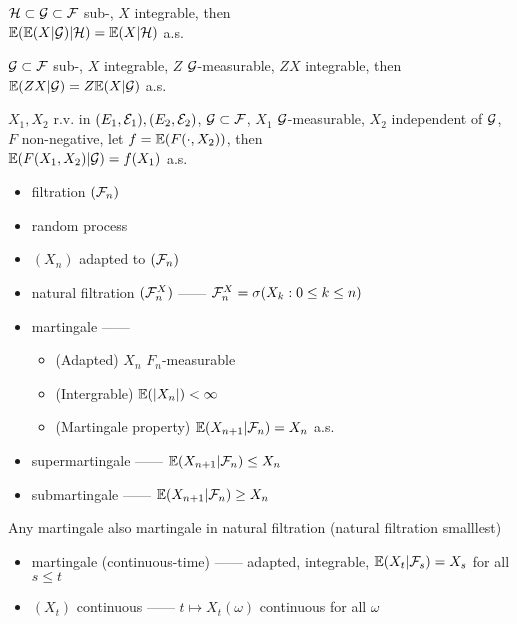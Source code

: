 \begin{prop}
    $\mathcal{H} \subset \mathcal{G} \subset \mathcal{F}$ sub-\sa, $X$ integrable, then \\
    $\mathbb{E}(\mathbb{E}(X|\mathcal{G})|\mathcal{H}) = \mathbb{E}(X|\mathcal{H})$ a.s.\
\end{prop}

\begin{prop}
    $\mathcal{G} \subset \mathcal{F}$ sub-\sa, $X$ integrable, $Z$ $\mathcal{G}$-measurable, $ZX$ integrable, then \\
    $\mathbb{E}(ZX|\mathcal{G}) = Z\mathbb{E}(X|\mathcal{G})$ a.s.\
\end{prop}

\begin{prop}
    $X_1, X_2$ r.v. in $(E_1, \mathcal{E}_1), (E_2, \mathcal{E}_2)$, $\mathcal{G} \subset \mathcal{F}$, $X_1$ $\mathcal{G}$-measurable, $X_2$ independent of $\mathcal{G}$, $F$ non-negative, let $f = \mathbb{E}(F(\cdot, X_2))$, then \\
    $\mathbb{E}(F(X_1, X_2)|\mathcal{G}) = f(X_1)$ a.s.
\end{prop}

\begin{itemize}
    \item filtration $(\mathcal{F}_n)$
    \item random process
    \item $(X_n)$ adapted to $(\mathcal{F}_n)$
    \item natural filtration $(\mathcal{F}_n^X)$ ------ $\mathcal{F}_n^X = \sigma(X_k : 0 \leq k \leq n)$
    \item martingale ------
    \begin{itemize}
        \item (Adapted) $X_n$ $F_n$-measurable
        \item (Intergrable) $\mathbb{E}(|X_n|) < \infty$
        \item (Martingale property) $\mathbb{E}(X_{n+1}|\mathcal{F}_n) = X_n$ a.s.\
    \end{itemize}
    \item supermartingale ------ $\mathbb{E}(X_{n+1}|\mathcal{F}_n) \leq X_n$
    \item submartingale ------ $\mathbb{E}(X_{n+1}|\mathcal{F}_n) \geq X_n$
\end{itemize}

\begin{fact}
    Any martingale also martingale in natural filtration (natural filtration smalllest)
\end{fact}

\begin{itemize}
    \item martingale (continuous-time) ------ adapted, integrable, $\mathbb{E}(X_t|\mathcal{F}_s) = X_s$ for all $s\leq t$
    \item $(X_t)$ continuous ------ $t \mapsto X_t(\omega)$ continuous for all $\omega$
\end{itemize}

